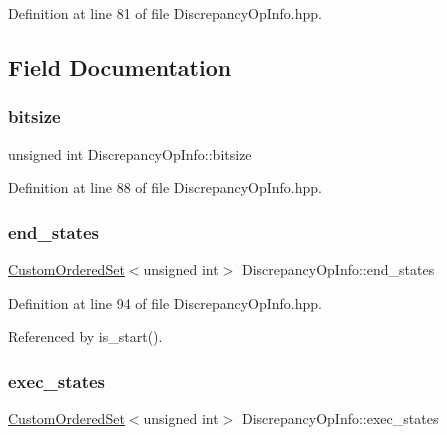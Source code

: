 Definition at line 81 of file Discrepancy\+Op\+Info.\+hpp.



\subsection{Field Documentation}
\mbox{\label{classDiscrepancyOpInfo_ad316fe02fb9b8b574a5a7f90f5a05fd0}} 
\subsubsection{\texorpdfstring{bitsize}{bitsize}}
{\footnotesize\ttfamily unsigned int Discrepancy\+Op\+Info\+::bitsize}



Definition at line 88 of file Discrepancy\+Op\+Info.\+hpp.

\mbox{\label{classDiscrepancyOpInfo_a9be06b77ea509fa96912a241f3f23569}} 
\subsubsection{\texorpdfstring{end\+\_\+states}{end\_states}}
{\footnotesize\ttfamily \hyperlink{classCustomOrderedSet}{Custom\+Ordered\+Set}$<$unsigned int$>$ Discrepancy\+Op\+Info\+::end\+\_\+states}



Definition at line 94 of file Discrepancy\+Op\+Info.\+hpp.



Referenced by is\+\_\+start().

\mbox{\label{classDiscrepancyOpInfo_a90b8d325b6ecdee02809645564d1cb8b}} 
\subsubsection{\texorpdfstring{exec\+\_\+states}{exec\_states}}
{\footnotesize\ttfamily \hyperlink{classCustomOrderedSet}{Custom\+Ordered\+Set}$<$unsigned int$>$ Discrepancy\+Op\+Info\+::exec\+\_\+states}



